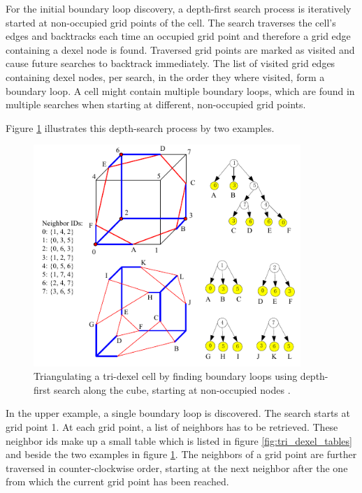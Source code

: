 For the initial boundary loop discovery, a depth-first search process is iteratively started at non-occupied grid points of the cell.
The search traverses the cell's edges and backtracks each time an occupied grid point and therefore a grid edge containing a dexel node is found.
Traversed grid points are marked as visited and cause future searches to backtrack immediately.
The list of visited grid edges containing dexel nodes, per search, in the order they where visited, form a boundary loop.
A cell might contain multiple boundary loops, which are found in multiple searches when starting at different, non-occupied grid points.

Figure \ref{fig:tri_dexel_triangulation} illustrates this depth-search process by two examples.
%
\begin{figure}
	\centering
	\includegraphics[width=0.9\textwidth]{images/tri_dexel_triangulation}
	\caption{
		Triangulating a tri-dexel cell by finding boundary loops using depth-first search along the cube, starting at non-occupied nodes \cite{tridexel_reconstruction}.
	}
	\label{fig:tri_dexel_triangulation}
\end{figure}
%
In the upper example, a single boundary loop is discovered.
The search starts at grid point 1.
At each grid point, a list of neighbors has to be retrieved.
These neighbor ids make up a small table which is listed in figure \ref{fig:tri_dexel_tables} and beside the two examples in figure \ref{fig:tri_dexel_triangulation}.
The neighbors of a grid point are further traversed in counter-clockwise order, starting at the next neighbor after the one from which the current grid point has been reached.
